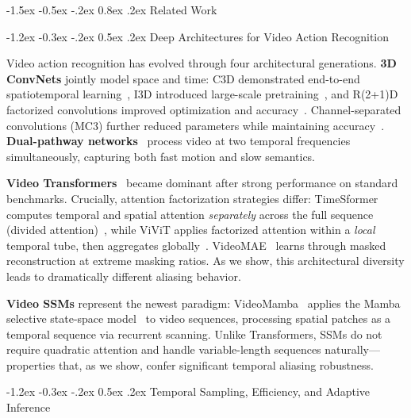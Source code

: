 \documentclass[runningheads]{llncs}
\makeatletter
\renewcommand\section{\@startsection{section}{1}{\z@}%
                       {-1.5ex \@plus -0.5ex \@minus -.2ex}%
                       {0.8ex \@plus .2ex}%
                       {\normalfont\large\bfseries\boldmath}}
\renewcommand\subsection{\@startsection{subsection}{2}{\z@}%
                       {-1.2ex \@plus -0.3ex \@minus -.2ex}%
                       {0.5ex \@plus .2ex}%
                       {\normalfont\normalsize\bfseries\boldmath}}
\makeatother
\begin{document}
\section{Related Work}
\label{sec:related}

\subsection{Deep Architectures for Video Action Recognition}

Video action recognition has evolved through four architectural generations.
\textbf{3D ConvNets} jointly model space and time: C3D demonstrated end-to-end
spatiotemporal learning~\cite{tran2015c3d}, I3D introduced large-scale
pretraining~\cite{carreira2017i3d}, and R(2+1)D factorized convolutions improved
optimization and accuracy~\cite{tran2018r2plus1d}.
Channel-separated convolutions (MC3) further reduced parameters while
maintaining accuracy~\cite{tran2019video}.
\textbf{Dual-pathway networks}~\cite{feichtenhofer2019slowfast} process video at
two temporal frequencies simultaneously, capturing both fast motion and slow semantics.

\textbf{Video Transformers}~\cite{bertasius2021timesformer,arnab2021vivit,tong2022videomae}
became dominant after strong performance on standard benchmarks.
Crucially, attention factorization strategies differ: TimeSformer computes temporal
and spatial attention \emph{separately} across the full sequence (divided
attention)~\cite{bertasius2021timesformer}, while ViViT applies factorized
attention within a \emph{local} temporal tube, then aggregates globally~\cite{arnab2021vivit}.
VideoMAE~\cite{tong2022videomae} learns through masked reconstruction at extreme
masking ratios.
As we show, this architectural diversity leads to dramatically different aliasing behavior.

\textbf{Video SSMs} represent the newest paradigm: VideoMamba~\cite{li2024videomamba}
applies the Mamba selective state-space model~\cite{gu2023mamba} to video sequences,
processing spatial patches as a temporal sequence via recurrent scanning.
Unlike Transformers, SSMs do not require quadratic attention and handle
variable-length sequences naturally—properties that, as we show, confer
significant temporal aliasing robustness.

\subsection{Temporal Sampling, Efficiency, and Adaptive Inference}
\end{document}
